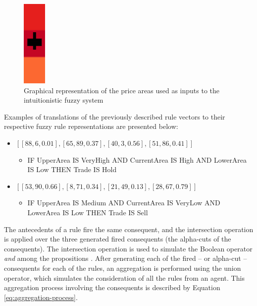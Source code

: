 \begin{figure}
\centering
\includegraphics[height=0.15\textwidth]{img/areas-for-ifis.png}
\caption{Graphical representation of the price areas used as inputs to the
  intuitionistic fuzzy system}
\label{figure:areas-for-ifis}
\end{figure}

Examples of translations of the previously described rule vectors to their respective fuzzy rule representations are presented below:

\begin{itemize}
	\item $[[88, 6, 0.01], [65, 89, 0.37], [40, 3, 0.56], [51, 86, 0.41]]$
	\begin{itemize}
    	\item IF UpperArea IS VeryHigh AND CurrentArea IS High AND LowerArea IS Low THEN Trade IS Hold 
    \end{itemize}
    \item $[[53, 90, 0.66], [8, 71, 0.34], [21, 49, 0.13], [28, 67, 0.79]]$
	\begin{itemize}
    	\item IF UpperArea IS Medium AND CurrentArea IS VeryLow AND LowerArea IS Low THEN Trade IS Sell 
    \end{itemize}
\end{itemize}


The antecedents of a rule fire the same consequent, and the intersection
operation is applied over the three generated fired consequents (the alpha-cuts
of the consequents). The intersection operation is used to simulate the Boolean
operator \textit{and} among the propositions \cite{Atanassov1986}. After
generating each of the fired -- or alpha-cut -- consequents for each of the rules,
an aggregation is performed using the union operator, which simulates the
consideration of all the rules from an agent. This aggregation process involving
the consequents is described by Equation \ref{eq:aggregation-process}.


